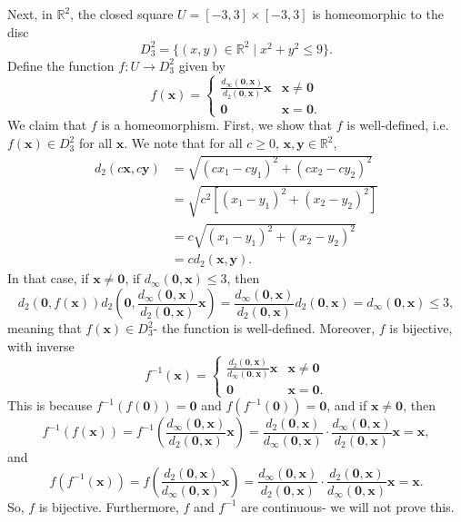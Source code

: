 \documentclass[a4paper, openany]{memoir}
\theoremstyle{definition}
\theoremstyle{plain}
\begin{document}
Next, in $\mathbb{R}^2$, the closed square $U = [-3, 3] \times [-3, 3]$ is homeomorphic to the disc 
\[D_3^2 = \{(x, y) \in \mathbb{R}^2 \mid x^2 + y^2 \leqslant 9\}.\]
Define the function $f: U \to D_3^2$ given by 
\[f(\bm{x}) = \begin{cases}
\frac{d_\infty(\bm{0}, \bm{x})}{d_2(\bm{0}, \bm{x})} \bm{x} & \bm{x} \neq \bm{0} \\
\bm{0} & \bm{x} = \bm{0}.
\end{cases}\]
We claim that $f$ is a homeomorphism. First, we show that $f$ is well-defined, i.e. $f(\bm{x}) \in D_3^2$ for all $\bm{x}$. We note that for all $c \geqslant 0$, $\bm{x}, \bm{y} \in \mathbb{R}^2$,
\begin{align*}
    d_2(c\bm{x}, c\bm{y}) &= \sqrt{(cx_1 - cy_1)^2 + (cx_2 - cy_2)^2} \\
    &= \sqrt{c^2[(x_1 - y_1)^2 + (x_2 - y_2)^2]} \\
    &= c \sqrt{(x_1  - y_1)^2 + (x_2 - y_2)^2} \\
    &= c d_2(\bm{x}, \bm{y}).
\end{align*}
In that case, if $\bm{x} \neq \bm{0}$, if $d_\infty(\bm{0}, \bm{x}) \leqslant 3$, then
\[d_2(\bm{0}, f(\bm{x})) d_2 \left(\bm{0}, \frac{d_\infty(\bm{0}, \bm{x})}{d_2(\bm{0}, \bm{x})} \bm{x} \right) = \frac{d_\infty(\bm{0}, \bm{x})}{d_2(\bm{0}, \bm{x})} d_2(\bm{0}, \bm{x}) = d_\infty(\bm{0}, \bm{x}) \leqslant 3,\]
meaning that $f(\bm{x}) \in D_3^2$- the function is well-defined. Moreover, $f$ is bijective, with inverse
\[f^{-1}(\bm{x}) = \begin{cases}
\frac{d_2(\bm{0}, \bm{x})}{d_\infty(\bm{0}, \bm{x})} \bm{x} & \bm{x} \neq \bm{0} \\
\bm{0} & \bm{x} = \bm{0}.
\end{cases}\]
This is because $f^{-1}(f(\bm{0})) = \bm{0}$ and $f(f^{-1}(\bm{0})) = \bm{0}$, and if $\bm{x} \neq \bm{0}$, then
\[f^{-1}(f(\bm{x})) = f^{-1} \left(\frac{d_\infty(\bm{0}, \bm{x})}{d_2(\bm{0}, \bm{x})} \bm{x}\right) = \frac{d_2(\bm{0}, \bm{x})}{d_\infty(\bm{0}, \bm{x})} \cdot \frac{d_\infty(\bm{0}, \bm{x})}{d_2(\bm{0}, \bm{x})} \bm{x} = \bm{x},\]
and
\[f(f^{-1}(\bm{x})) = f\left(\frac{d_2(\bm{0}, \bm{x})}{d_\infty(\bm{0}, \bm{x})} \bm{x}\right) = \frac{d_\infty(\bm{0}, \bm{x})}{d_2(\bm{0}, \bm{x})} \cdot \frac{d_2(\bm{0}, \bm{x})}{d_\infty(\bm{0}, \bm{x})} \bm{x} = \bm{x}.\]
So, $f$ is bijective. Furthermore, $f$ and $f^{-1}$ are continuous- we will not prove this.
\newpage
\end{document}

